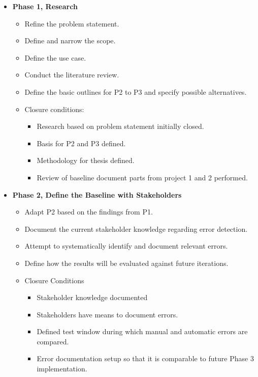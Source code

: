 \begin{itemize}

    \item \textbf{Phase 1, Research}
    \begin{itemize}
        \item Refine the problem statement.
        \item Define and narrow the scope.
        \item Define the use case.
        \item Conduct the literature review.
        \item Define the basic outlines for P2 to P3 and specify possible alternatives.
        \item Closure conditions:
        \begin{itemize}
            \item Research based on problem statement initially closed.
            \item Basis for P2 and P3 defined.
            \item Methodology for thesis defined.
            \item Review of baseline document parts from project 1 and 2 performed.
        \end{itemize}
    \end{itemize}

    \item \textbf{Phase 2, Define the Baseline with Stakeholders}
    \begin{itemize}
        \item Adapt P2 based on the findings from P1.
        \item Document the current stakeholder knowledge regarding error detection.
        \item Attempt to systematically identify and document relevant errors.
        \item Define how the results will be evaluated against future iterations.
        \item Closure Conditions
        \begin{itemize}
            \item Stakeholder knowledge documented
            \item Stakeholders have means to document errors.
            \item Defined test window during which manual and automatic errors are compared.
            \item Error documentation setup so that it is comparable to future Phase 3 implementation.
        \end{itemize}
    \end{itemize}



\end{itemize}
